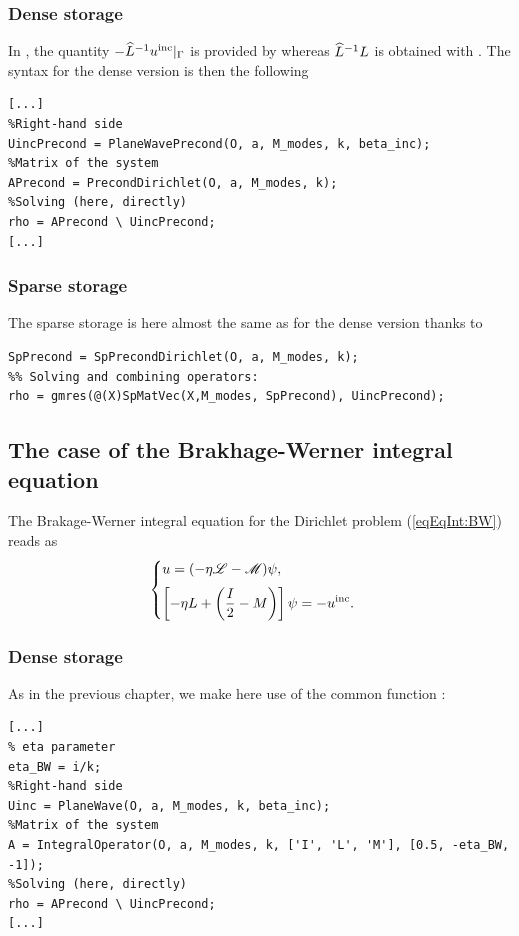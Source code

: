 \subsubsection{Dense storage}

In \mudiff, the quantity $-\widehat{L}^{-1}u^{\textrm{inc}}|_{\Gamma}$ is provided by \PlaneWavePrecond whereas $\widehat{L}^{-1} L$ is obtained with \PrecondDirichlet. The syntax for the dense version is then the following
\begin{lstlisting}
[...]
%Right-hand side
UincPrecond = PlaneWavePrecond(O, a, M_modes, k, beta_inc);
%Matrix of the system
APrecond = PrecondDirichlet(O, a, M_modes, k);
%Solving (here, directly)
rho = APrecond \ UincPrecond;
[...]
\end{lstlisting}
\medskip

\subsubsection{Sparse storage}

The sparse storage is here almost the same as for the dense version thanks to \SpPrecondDirichlet
\begin{lstlisting}
SpPrecond = SpPrecondDirichlet(O, a, M_modes, k);
%% Solving and combining operators:
rho = gmres(@(X)SpMatVec(X,M_modes, SpPrecond), UincPrecond);
\end{lstlisting}
\medskip

\subsection{The case of the Brakhage-Werner integral equation}
\label{secEx:BWIED}
The Brakage-Werner integral equation for the Dirichlet problem (\ref{eqEqInt:BW}) reads as
$$
\begin{cases}
\displaystyle u = (-\eta{\mathscr L} - {\mathscr M})\psi,\\[0.2cm]
\displaystyle \left[-\eta L +\left(\frac{I}{2} - M\right)\right]\psi = -u^{\textrm{inc}}.
\end{cases}
$$

\subsubsection{Dense storage}

As in the previous chapter, we make here use of the common function \IntegralOperator:
\begin{lstlisting}
[...]
% eta parameter
eta_BW = i/k;
%Right-hand side
Uinc = PlaneWave(O, a, M_modes, k, beta_inc);
%Matrix of the system
A = IntegralOperator(O, a, M_modes, k, ['I', 'L', 'M'], [0.5, -eta_BW, -1]);
%Solving (here, directly)
rho = APrecond \ UincPrecond;
[...]
\end{lstlisting}
\medskip

